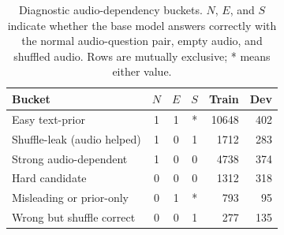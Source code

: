 \begin{table}[t]
\centering
\small
\caption{Diagnostic audio-dependency buckets. $N$, $E$, and $S$ indicate whether the base model answers correctly with the normal audio-question pair, empty audio, and shuffled audio. Rows are mutually exclusive; * means either value.}
\label{tab:bucket_summary}
\begin{tabular}{l|ccc|rr}
\toprule
Bucket & $N$ & $E$ & $S$ & Train & Dev \\
\midrule
Easy text-prior & 1 & 1 & * & 10648 & 402 \\
Shuffle-leak (audio helped) & 1 & 0 & 1 & 1712 & 283 \\
Strong audio-dependent & 1 & 0 & 0 & 4738 & 374 \\
Hard candidate & 0 & 0 & 0 & 1312 & 318 \\
Misleading or prior-only & 0 & 1 & * & 793 & 95 \\
Wrong but shuffle correct & 0 & 0 & 1 & 277 & 135 \\
\bottomrule
\end{tabular}
\vspace{-15pt}
\end{table}
